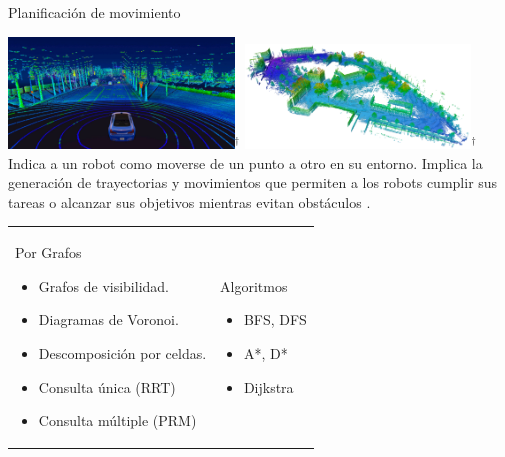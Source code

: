\documentclass[
  24pt, %
  aspectratio=169, %
]{beamer}
\begin{document}
\begin{frame}{Planificación de movimiento}
  
  \centering
  \includegraphics[width=0.45\textwidth,height=0.35\textheight]{map3d.jpg}$^\dag$
  \hfil
  \includegraphics[width=0.45\textwidth,height=0.35\textheight]{map3d_2}$^\dag$
  \vspace{2pt}\\
  \bigskip %
  Indica a un robot como moverse de un punto a otro en su entorno. Implica la generación de trayectorias y movimientos que permiten a los robots cumplir sus tareas o alcanzar sus objetivos mientras evitan obstáculos \footnotemark.\\
  \bigskip %
  \addvspace{\medskipamount}
  \noindent
  \begin{tabularx}{\linewidth}{ @{} X X @{} }
    Por Grafos
    
    \begin{itemize}
    \item Grafos de visibilidad. 
    \item Diagramas de Voronoi.
    \item Descomposición por celdas.
    \item Consulta única (RRT)
    \item Consulta múltiple (PRM)
    \end{itemize} &

    Algoritmos
    
    \begin{itemize}
    \item BFS, DFS
    \item A*, D*
    \item Dijkstra
    \end{itemize}
  \end{tabularx}
\end{frame}
\end{document}
